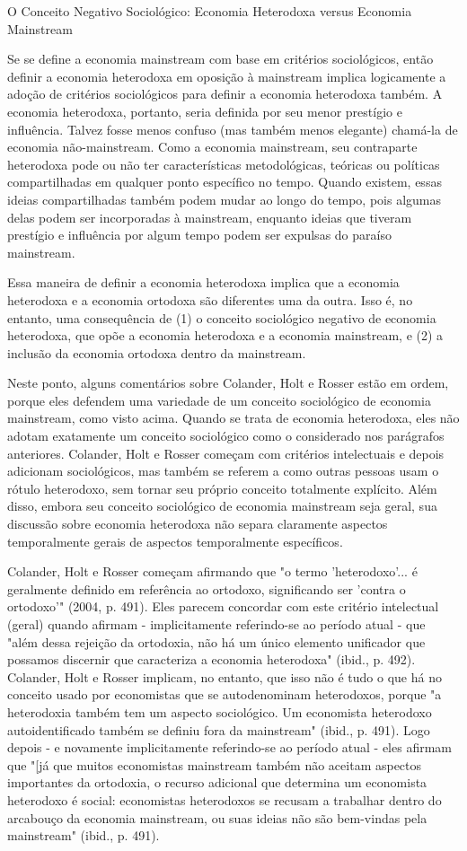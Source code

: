 \documentclass[12pt]{article}
\begin{document}
O Conceito Negativo Sociológico: Economia Heterodoxa versus Economia Mainstream

Se se define a economia mainstream com base em critérios sociológicos, então definir a economia heterodoxa em oposição à mainstream implica logicamente a adoção de critérios sociológicos para definir a economia heterodoxa também. A economia heterodoxa, portanto, seria definida por seu menor prestígio e influência. Talvez fosse menos confuso (mas também menos elegante) chamá-la de economia não-mainstream. Como a economia mainstream, seu contraparte heterodoxa pode ou não ter características metodológicas, teóricas ou políticas compartilhadas em qualquer ponto específico no tempo. Quando existem, essas ideias compartilhadas também podem mudar ao longo do tempo, pois algumas delas podem ser incorporadas à mainstream, enquanto ideias que tiveram prestígio e influência por algum tempo podem ser expulsas do paraíso mainstream.

Essa maneira de definir a economia heterodoxa implica que a economia heterodoxa e a economia ortodoxa são diferentes uma da outra. Isso é, no entanto, uma consequência de (1) o conceito sociológico negativo de economia heterodoxa, que opõe a economia heterodoxa e a economia mainstream, e (2) a inclusão da economia ortodoxa dentro da mainstream.

Neste ponto, alguns comentários sobre Colander, Holt e Rosser estão em ordem, porque eles defendem uma variedade de um conceito sociológico de economia mainstream, como visto acima. Quando se trata de economia heterodoxa, eles não adotam exatamente um conceito sociológico como o considerado nos parágrafos anteriores. Colander, Holt e Rosser começam com critérios intelectuais e depois adicionam sociológicos, mas também se referem a como outras pessoas usam o rótulo heterodoxo, sem tornar seu próprio conceito totalmente explícito. Além disso, embora seu conceito sociológico de economia mainstream seja geral, sua discussão sobre economia heterodoxa não separa claramente aspectos temporalmente gerais de aspectos temporalmente específicos.

Colander, Holt e Rosser começam afirmando que "o termo 'heterodoxo'... é geralmente definido em referência ao ortodoxo, significando ser 'contra o ortodoxo'" (2004, p. 491). Eles parecem concordar com este critério intelectual (geral) quando afirmam - implicitamente referindo-se ao período atual - que "além dessa rejeição da ortodoxia, não há um único elemento unificador que possamos discernir que caracteriza a economia heterodoxa" (ibid., p. 492). Colander, Holt e Rosser implicam, no entanto, que isso não é tudo o que há no conceito usado por economistas que se autodenominam heterodoxos, porque "a heterodoxia também tem um aspecto sociológico. Um economista heterodoxo autoidentificado também se definiu fora da mainstream" (ibid., p. 491). Logo depois - e novamente implicitamente referindo-se ao período atual - eles afirmam que "[já que muitos economistas mainstream também não aceitam aspectos importantes da ortodoxia, o recurso adicional que determina um economista heterodoxo é social: economistas heterodoxos se recusam a trabalhar dentro do arcabouço da economia mainstream, ou suas ideias não são bem-vindas pela mainstream" (ibid., p. 491).
\end{document}
